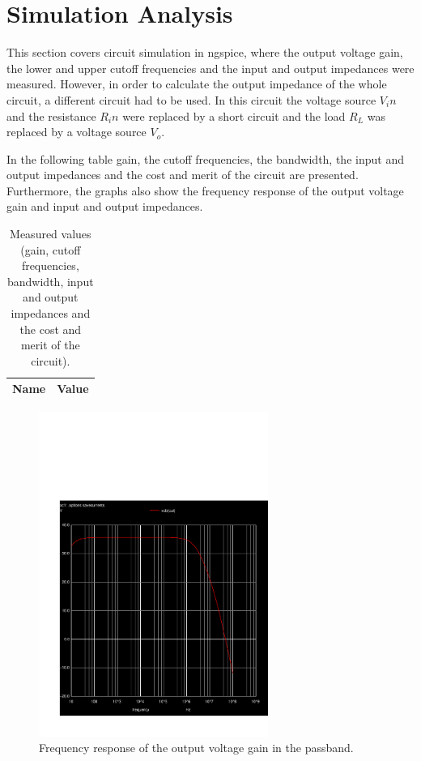 \newpage
\section{Simulation Analysis}
\label{sec:simulation}
This section covers circuit simulation in ngspice, where the output voltage gain, the lower and upper cutoff frequencies and the input and output impedances were measured. However, in order to calculate the output impedance of the whole circuit, a different circuit had to be used. In this circuit the voltage source $V_in$ and the resistance $R_in$ were replaced by a short circuit and the load $R_L$ was replaced by a voltage source $V_o$.

In the following table gain, the cutoff frequencies, the bandwidth, the input and output impedances and the cost and merit of the circuit are presented. Furthermore, the graphs also show the frequency response of the output voltage gain and input and output impedances.

\begin{table}[h!]
  \centering
  \begin{tabular}{|c|c|}
    \hline    
    {\bf Name} & {\bf Value} \\ \hline
    
    
  \end{tabular}
 \caption{Measured values (gain, cutoff frequencies, bandwidth, input and output impedances and the cost and merit of the circuit).}
  \label{tab:optabs}
\end{table}

\begin{figure}[h!] \centering
\includegraphics[width=7.5cm]{../sim/vo2f.pdf}
\caption{Frequency response of the output voltage gain in the passband.}
\label{fig:output voltage gain}
\end{figure}

